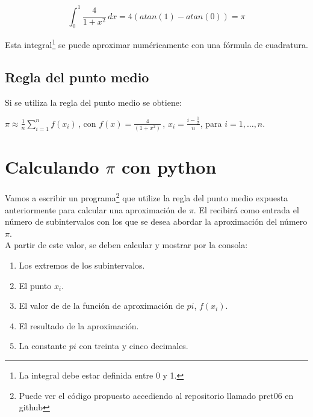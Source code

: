 \documentclass[spanish,a4paper,11pt]{article}
\begin{document}
$$\int_{0}^{1} \!\frac{4}{1+x^2}\, dx = 4(atan(1) -atan(0)) = \pi $$

Esta integral\footnote{La integral debe estar definida entre 0 y 1.} se puede aproximar numéricamente con una fórmula de cuadratura.


\subsection{Regla del punto medio}

Si se utiliza la regla del punto medio se obtiene:

\begin{center}
$ \pi \approx \frac{1}{n} \sum\limits_{i=1}^{n}f(x_i)\,$,
con $f(x) = \frac{4}{(1+x^2)}\,$,
$x_i = \frac{i - \frac{1}{2}}{n}$,
para $i = 1, \dots, n$.
\end{center}


\section{Calculando $\pi$ con python}

Vamos a escribir un programa\footnote{Puede ver el código propuesto accediendo al repositorio llamado prct06 en github} que utilize la regla del punto medio expuesta anteriormente para calcular una aproximación de $\pi$. El recibirá
como entrada el número de subintervalos con los que se desea abordar la aproximación del número $\pi$.\\
\cite{python}
A partir de este valor, se deben calcular y mostrar por la consola:

\begin{enumerate}
  \item
    Los extremos de los subintervalos.
  \item
    El punto $x_i$.
  \item
    El valor de de la función de aproximación de $pi$, $f(x_i)$.
  \item
    El resultado de la aproximación.
  \item
    La constante $pi$ con treinta y cinco decimales.
\end{enumerate}

\end{document}
